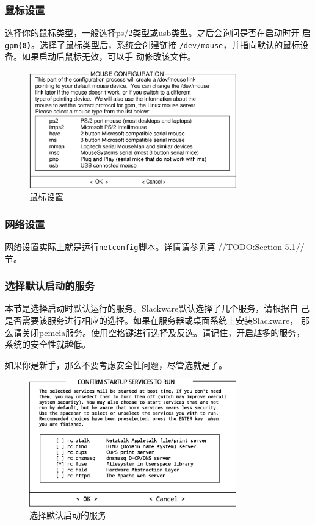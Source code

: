 \subsubsection{鼠标设置}
\label{sec:installation:setup:configure:mouse}
选择你的鼠标类型，一般选择ps/2类型或usb类型。之后会询问是否在启动时开
启\texttt{gpm\textbf{(8)}}。选择了鼠标类型后，系统会创建链接
\texttt{/dev/mouse}，并指向默认的鼠标设备。如果启动后鼠标无效，可以手
动修改该文件。
\begin{figure}[htpb]
  \centering
  \includegraphics[width=0.8\textwidth]{images/installation/setup-mouse.eps}
  \caption{鼠标设置}
  \label{fig:setup-mouse}
\end{figure}

\subsubsection{网络设置}
\label{sec:installation:setup:configure:network}
网络设置实际上就是运行\texttt{netconfig}脚本。详情请参见第
//TODO:Section 5.1//节。

\subsubsection{选择默认启动的服务}
\label{sec:installation:setup:configure:services}
本节是选择启动时默认运行的服务。Slackware默认选择了几个服务，请根据自
己是否需要该服务进行相应的选择。如果在服务器或桌面系统上安装Slackware，
那么请关闭pcmcia服务。使用空格键进行选择及反选。请记住，开启越多的服务，
系统的安全性就越低。

如果你是新手，那么不要考虑安全性问题，尽管选就是了。
\begin{figure}[htpb]
  \centering
  \includegraphics[width=0.8\textwidth]{images/installation/setup-services.eps}
  \caption{选择默认启动的服务}
  \label{fig:setup-services}
\end{figure}

